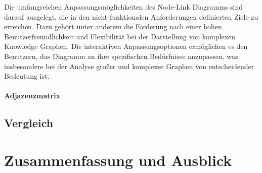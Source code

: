 Die umfangreichen Anpassungsmöglichkeiten des Node-Link Diagramms sind darauf ausgelegt, die in den nicht-funktionalen Anforderungen definierten Ziele zu erreichen. Dazu gehört unter anderem die Forderung nach einer hohen Benutzerfreundlichkeit und Flexibilität bei der Darstellung von komplexen Knowledge Graphen. Die interaktiven Anpassungsoptionen ermöglichen es den Benutzern, das Diagramm an ihre spezifischen Bedürfnisse anzupassen, was insbesondere bei der Analyse großer und komplexer Graphen von entscheidender Bedeutung ist.

\subsubsection{Adjazenzmatrix}

\section{Vergleich}
\label{realization:comparison}

\chapter{Zusammenfassung und Ausblick}